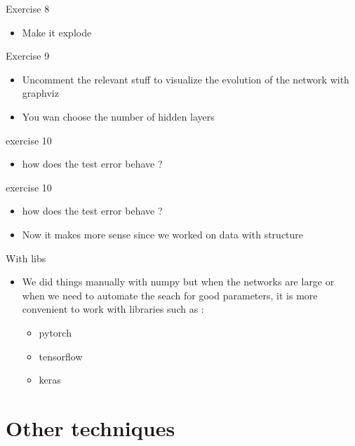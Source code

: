 \documentclass{beamer}
\begin{document}
\begin{frame}{Exercise 8}
    \begin{itemize}
    \item Make it explode
    \end{itemize}
\end{frame}


\begin{frame}{Exercise 9}
    \begin{itemize}
    \item Uncomment the relevant stuff to visualize the evolution of the
        network with graphviz
    \item You wan choose the number of hidden layers
    \end{itemize}
\end{frame}

\begin{frame}{exercise 10}
    \begin{itemize}
        \item how does the test error behave ?
    \end{itemize}
\end{frame}
\begin{frame}{exercise 10}
    \begin{itemize}
        \item how does the test error behave ?
            \item Now it makes more sense since we worked on data with
                structure
    \end{itemize}
\end{frame}

\begin{frame}{With libs}
    \begin{itemize}
        \item We did things manually with numpy but when the networks are large
            or when we need to automate the seach for good parameters, it is
            more convenient to work with libraries such as :
            \begin{itemize}
                \item pytorch
                    \item tensorflow
                        \item keras
            \end{itemize}
    \end{itemize}
\end{frame}

\section{Other techniques}%
\label{sec:other_techniques}
\end{document}
